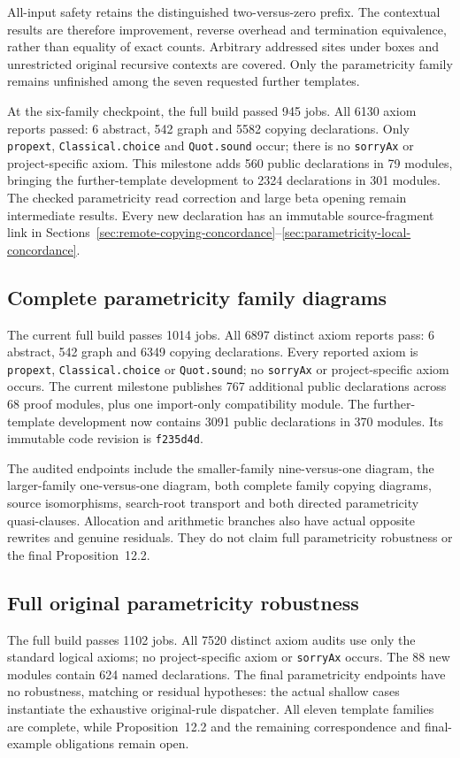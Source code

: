 All-input safety retains the distinguished two-versus-zero prefix. The
contextual results are therefore improvement, reverse overhead and
termination equivalence, rather than equality of exact counts. Arbitrary
addressed sites under boxes and unrestricted original recursive contexts
are covered. Only the parametricity family remains unfinished among the
seven requested further templates.

At the six-family checkpoint, the full build passed 945 jobs. All 6130 axiom reports passed: 6 abstract,
542 graph and 5582 copying declarations. Only \texttt{propext},
\texttt{Classical.choice} and \texttt{Quot.sound} occur; there is no
\texttt{sorryAx} or project-specific axiom. This milestone adds 560 public
declarations in 79 modules, bringing the further-template development to
2324 declarations in 301 modules. The checked parametricity read correction
and large beta opening remain intermediate results. Every new declaration
has an immutable source-fragment link in
Sections~\ref{sec:remote-copying-concordance}--\ref{sec:parametricity-local-concordance}.

\subsection{Complete parametricity family diagrams}
The current full build passes 1014 jobs. All 6897 distinct axiom reports pass:
6 abstract, 542 graph and 6349 copying declarations. Every reported axiom is
\texttt{propext}, \texttt{Classical.choice} or \texttt{Quot.sound}; no
\texttt{sorryAx} or project-specific axiom occurs. The current milestone
publishes 767 additional public declarations across 68 proof modules, plus
one import-only compatibility module. The further-template development now
contains 3091 public declarations in 370 modules. Its immutable code revision
is \texttt{f235d4d}.

The audited endpoints include the smaller-family nine-versus-one diagram,
the larger-family one-versus-one diagram, both complete family copying
diagrams, source isomorphisms, search-root transport and both directed
parametricity quasi-clauses. Allocation and arithmetic branches also have
actual opposite rewrites and genuine residuals. They do not claim full
parametricity robustness or the final Proposition~12.2.

\subsection{Full original parametricity robustness}
The full build passes 1102 jobs. All 7520 distinct axiom audits use only the standard logical axioms; no project-specific axiom or \texttt{sorryAx} occurs. The 88 new modules contain 624 named declarations. The final parametricity endpoints have no robustness, matching or residual hypotheses: the actual shallow cases instantiate the exhaustive original-rule dispatcher. All eleven template families are complete, while Proposition~12.2 and the remaining correspondence and final-example obligations remain open.

